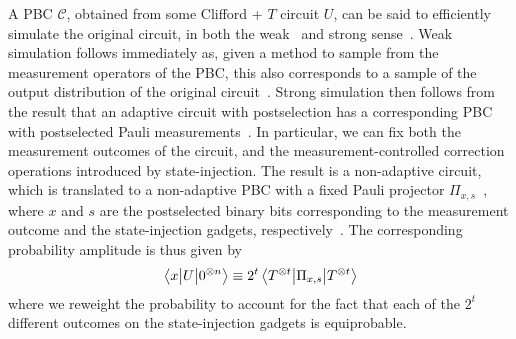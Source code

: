 A PBC $\mathcal{C}$, obtained from some Clifford + $T$ circuit $U$, can be said to efficiently simulate the original circuit, in both the weak~\cite{Yoganathan2019} and strong sense~\cite{Bravyi2015}. Weak simulation follows immediately as, given a method to sample from the measurement operators of the PBC, this also corresponds to a sample of the output distribution of the original circuit~\cite{Yoganathan2019}. Strong simulation then follows from the result that an adaptive circuit with postselection has a corresponding PBC with postselected Pauli measurements~\cite{Yoganathan2019}. In particular, we can fix both the measurement outcomes of the circuit, and the measurement-controlled correction operations introduced by state-injection. The result is a non-adaptive circuit, which is translated to a non-adaptive PBC with a fixed Pauli projector $\Pi_{x,s}$~\cite{Yoganathan2019}, where $x$ and $s$ are the postselected binary bits corresponding to the measurement outcome and the state-injection gadgets, respectively~\cite{Bravyi2015,Bravyi2016}. The corresponding probability amplitude is thus given by
\begin{equation}
\matrixel{x}{U}{0^{\otimes n}}\equiv 2^{t}\matrixel{T^{\otimes t}}{\Pi_{x,s}}{T^{\otimes t}}
\label{eq:pbc_strongsim}
\end{equation}
where we reweight the probability to account for the fact that each of the $2^{t}$ different outcomes on the state-injection gadgets is equiprobable.
